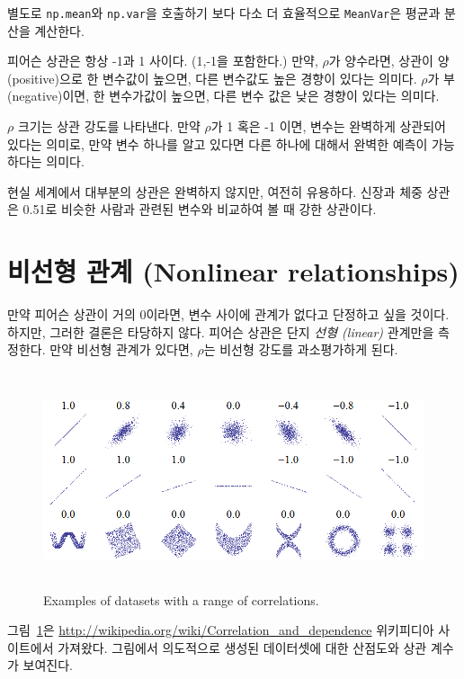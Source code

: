 별도로 {\tt np.mean}와 {\tt np.var}을 호출하기 보다 다소 더 효율적으로 {\tt MeanVar}은 평균과 분산을 계산한다.

피어슨 상관은 항상 -1과 1 사이다. (1,-1을 포함한다.) 만약, $\rho$가 양수라면, 상관이 양(positive)으로 한 변수값이 높으면, 다른 변수값도 높은 경향이 있다는 의미다. $\rho$가 부(negative)이면, 한 변수가값이 높으면, 다른 변수 값은 낮은 경향이 있다는 의미다.

$\rho$ 크기는 상관 강도를 나타낸다. 만약 $\rho$가 1 혹은 -1 이면, 변수는 완벽하게 상관되어 있다는 의미로, 만약 변수 하나를 알고 있다면 다른 하나에 대해서 완벽한 예측이 가능하다는 의미다.

현실 세계에서 대부분의 상관은 완벽하지 않지만, 여전히 유용하다.
신장과 체중 상관은 0.51로 비슷한 사람과 관련된 변수와 비교하여 볼 때 강한 상관이다.

\section{비선형 관계 (Nonlinear relationships)}

만약 피어슨 상관이 거의 0이라면, 변수 사이에 관계가 없다고 단정하고 싶을 것이다. 하지만, 그러한 결론은 타당하지 않다. 피어슨 상관은 단지 {\em
  선형 (linear)} 관계만을 측정한다. 만약 비선형 관계가 있다면, $\rho$는 비선형 강도를 과소평가하게 된다.


\begin{figure}
\centerline{\includegraphics[height=2.5in]{figs/Correlation_examples.png}}
\caption{Examples of datasets with a range of correlations.}
\label{corr_examples}
\end{figure}

그림~\ref{corr_examples}은 \url{http://wikipedia.org/wiki/Correlation_and_dependence} 위키피디아 사이트에서 가져왔다.
그림에서 의도적으로 생성된 데이터셋에 대한 산점도와 상관 계수가 보여진다.

